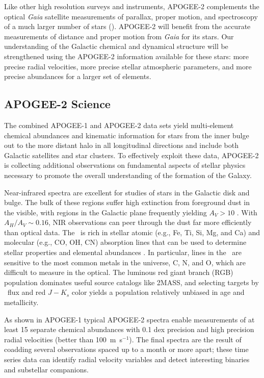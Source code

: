 Like other high resolution surveys and instruments, APOGEE-2
complements the optical {\it Gaia} satellite measurements of parallax,
proper motion, and spectroscopy of a much larger number of stars
(\citealt{prusti16a}). APOGEE-2 will benefit from the accurate
measurements of distance and proper motion from {\it Gaia} for its
stars. Our understanding of the Galactic chemical and dynamical
structure will be strengthened using the APOGEE-2 information
available for these stars: more precise radial velocities, more
precise stellar atmospheric parameters, and more precise abundances
for a larger set of elements.

\subsection{APOGEE-2 Science}

The combined APOGEE-1 and APOGEE-2 data sets yield multi-element
chemical abundances and kinematic information for stars from the inner
bulge out to the more distant halo in all longitudinal directions and
include both Galactic satellites and star clusters.  To effectively
exploit these data, APOGEE-2 is collecting additional observations on
fundamental aspects of stellar physics necessary to promote the
overall understanding of the formation of the Galaxy.

Near-infrared spectra are excellent for studies of stars in the
Galactic disk and bulge. The bulk of these regions suffer high
extinction from foreground dust in the visible, with regions in the
Galactic plane frequently yielding $A_{V} > 10$ \citep{nidever12a}.
With $A_{H}/A_{V} \sim 0.16$, NIR observations can peer through the
dust far more efficiently than optical data. The \Hband\ is rich in
stellar atomic (e.g., Fe, Ti, Si, Mg, and Ca) and molecular (e.g., CO, OH,
CN) absorption lines that can be used to determine stellar properties
and elemental abundances \citep{meszaros13a, holtzman15a,
  shetrone15a}. In particular, lines in the \Hband\ are sensitive to
the most common metals in the universe, C, N, and O, which are
difficult to measure in the optical.  The luminous red giant branch
(RGB) population dominates useful source catalogs like 2MASS, and
selecting targets by \Hband\ flux and red $J-K_s$ color
yields a population relatively unbiased in age and metallicity.

As shown in APOGEE-1 \citep{holtzman15a} typical APOGEE-2 spectra
enable measurements of at least 15 separate chemical abundances with
0.1 dex precision and high precision radial velocities (better than
100~m~s$^{-1}$).  The final spectra are the result of coadding several
observations spaced up to a month or more apart; these time series
data can identify radial velocity variables and detect interesting
binaries and substellar companions.

